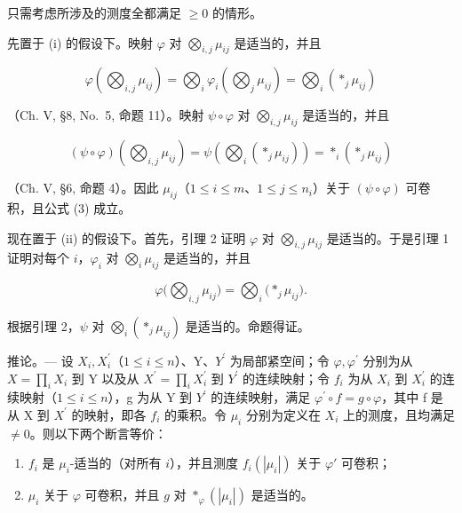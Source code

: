 只需考虑所涉及的测度全都满足 \(\geqslant 0\) 的情形。

先置于 (i) 的假设下。映射 \(\varphi\) 对 \(\bigotimes_{i,j} \mu_{ij}\) 是适当的，并且

\[
\varphi \left(\bigotimes_ {i, j} \mu_ {i j}\right) = \bigotimes_ {i} \varphi_ {i} \left(\bigotimes_ {j} \mu_ {i j}\right) = \bigotimes_ {i} \left(* _ {j} \mu_ {i j}\right)
\]

（Ch. V, §8, No.~5, 命题 11）。映射 \(\psi \circ \varphi\) 对 \(\bigotimes_{i,j} \mu_{ij}\) 是适当的，并且

\[
(\psi \circ \varphi) \left(\bigotimes_ {i, j} \mu_ {i j}\right) = \psi \left(\bigotimes_ {i} \left(* _ {j} \mu_ {i j}\right)\right) = * _ {i} \left(* _ {j} \mu_ {i j}\right)
\]

（Ch. V, §6, 命题 4）。因此 \(\mu_{ij}\)（\(1 \leqslant i \leqslant m\)、\(1 \leqslant j \leqslant n_i\)）关于 \((\psi \circ \varphi)\) 可卷积，且公式 (3) 成立。

现在置于 (ii) 的假设下。首先，引理 2 证明 \(\varphi\) 对 \(\bigotimes_{i,j} \mu_{ij}\) 是适当的。于是引理 1 证明对每个 \(i\)，\(\varphi_i\) 对 \(\bigotimes_{i} \mu_{ij}\) 是适当的，并且

\[
\varphi \Big (\bigotimes_ {i, j} \mu_ {i j} \Big) = \bigotimes_ {i} \Big (* _ {j} \mu_ {i j} \Big).
\]

根据引理 2，\(\psi\) 对 \(\bigotimes_{i}\left(*_{j}\mu_{ij}\right)\) 是适当的。命题得证。

推论。--- 设 \(X_{i}, X_{i}^{\prime}\)（\(1 \leqslant i \leqslant n\)）、Y、\(Y^{\prime}\) 为局部紧空间；令 \(\varphi, \varphi^{\prime}\) 分别为从 \(X = \prod_{i} X_{i}\) 到 Y 以及从 \(X^{\prime} = \prod_{i} X_{i}^{\prime}\) 到 \(Y^{\prime}\) 的连续映射；令 \(f_{i}\) 为从 \(X_{i}\) 到 \(X_{i}^{\prime}\) 的连续映射（\(1 \leqslant i \leqslant n\)），g 为从 Y 到 \(Y^{\prime}\) 的连续映射，满足 \(\varphi^{\prime} \circ f = g \circ \varphi\)，其中 f 是从 X 到 \(X^{\prime}\) 的映射，即各 \(f_{i}\) 的乘积。令 \(\mu_{i}\) 分别为定义在 \(X_{i}\) 上的测度，且均满足 \(\neq 0\)。则以下两个断言等价：

\begin{enumerate}
\def\labelenumi{(\roman{enumi})}
\item
  \(f_{i}\) 是 \(\mu_{i}\)-适当的（对所有 \(i\)），并且测度 \(f_{i}(|\mu_{i}|)\) 关于 \(\varphi'\) 可卷积；
\item
  \(\mu_{i}\) 关于 \(\varphi\) 可卷积，并且 \(g\) 对 \(*_{\varphi}(|\mu_i|)\) 是适当的。
\end{enumerate}

